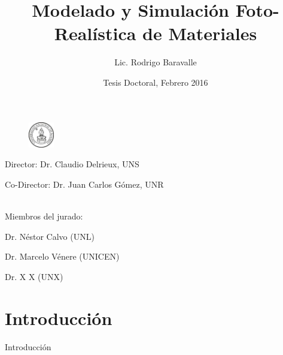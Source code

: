 \documentclass[spanish]{beamer}
\begin{document}
\title
    [Modelado Foto-Realístico de Materiales]{Modelado y Simulación Foto-Realística de Materiales}

\author[Lic. Rodrigo Baravalle]{Lic. Rodrigo Baravalle}
 

\date{Tesis Doctoral, Febrero 2016}

\begin{frame}
\begin{figure}
{\includegraphics[width=0.1\textwidth]{../figures/logounr}}
\end{figure}
\vspace{-1cm}
  \titlepage
\centering
\vspace{-.7cm}
\begin{tiny}
Director: Dr. Claudio Delrieux, UNS

Co-Director: Dr. Juan Carlos Gómez, UNR

\ \\

Miembros del jurado:

Dr. Néstor Calvo (UNL)

Dr. Marcelo Vénere (UNICEN)

Dr. X X (UNX)

\end{tiny}

\end{frame}

\section{Introducción}

\begin{frame}
\begin{block}{}
\begin{center}
\vspace{1cm}
\huge{Introducción}
\vspace{1cm}
\end{center}
\end{block}
\end{frame}
\end{document}

